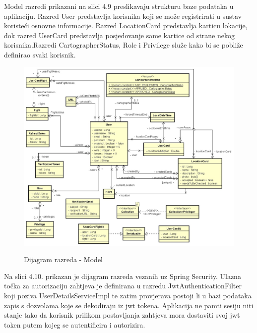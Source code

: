 			\textnormal{
				Model razredi prikazani na slici 4.9 preslikavaju strukturu baze podataka u aplikaciju. Razred User predstavlja korisnika koji se može registrirati u sustav koristeći osnovne informacije. Razred LocationCard predstavlja karticu lokacije, dok razred UserCard predstavlja posjedovanje same kartice od strane nekog korisnika.Razredi CartographerStatus, Role i Privilege služe kako bi se pobliže definirao svaki korisnik.
			}
			
			\begin{figure}[H]
				\centering
				\includegraphics[scale=0.75]{slike/modelCD} \\
				\caption{Dijagram razreda - Model}
				\label{fig:modelCD}
			\end{figure}
		
			\textnormal{
				Na slici 4.10. prikazan je dijagram razreda vezanih uz Spring Security. Ulazna
				točka za autorizaciju zahtjeva je definirana u razredu JwtAuthenticationFilter koji poziva UserDetailsServiceImpl te zatim provjerava postoji li u bazi podataka zapis s dozvolama
				koje se dekodiraju iz jwt tokena. Aplikacija
				ne pamti sesiju niti stanje tako da korisnik prilikom postavljanja zahtjeva mora dostaviti svoj jwt token putem kojeg se autentificira i autorizira.
			}
		
